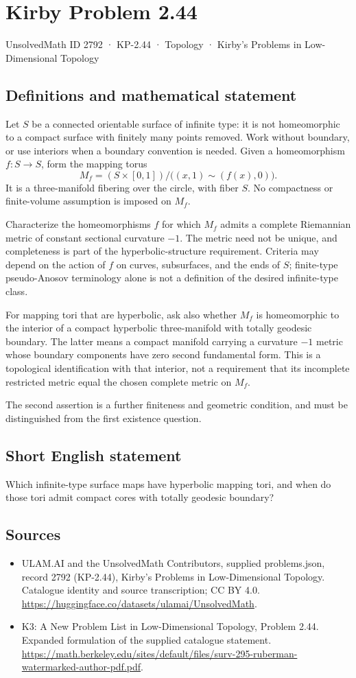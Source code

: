 \documentclass[11pt,a4paper]{article}
\begin{document}
\section*{Kirby Problem 2.44}\label{2792}
{\small UnsolvedMath ID 2792 · KP-2.44 · Topology · Kirby's Problems in Low-Dimensional Topology}
\subsection{Definitions and mathematical statement}
Let $S$ be a connected orientable surface of infinite type: it is not homeomorphic to a compact surface with finitely many points removed. Work without boundary, or use interiors when a boundary convention is needed. Given a homeomorphism $f:S\to S$, form the mapping torus
\[
M_f=(S\times[0,1])/\bigl((x,1)\sim(f(x),0)\bigr).
\]
It is a three-manifold fibering over the circle, with fiber $S$. No compactness or finite-volume assumption is imposed on $M_f$.

Characterize the homeomorphisms $f$ for which $M_f$ admits a complete Riemannian metric of constant sectional curvature $-1$. The metric need not be unique, and completeness is part of the hyperbolic-structure requirement. Criteria may depend on the action of $f$ on curves, subsurfaces, and the ends of $S$; finite-type pseudo-Anosov terminology alone is not a definition of the desired infinite-type class.

For mapping tori that are hyperbolic, ask also whether $M_f$ is homeomorphic to the interior of a compact hyperbolic three-manifold with totally geodesic boundary. The latter means a compact manifold carrying a curvature $-1$ metric whose boundary components have zero second fundamental form. This is a topological identification with that interior, not a requirement that its incomplete restricted metric equal the chosen complete metric on $M_f$.

The second assertion is a further finiteness and geometric condition, and must be distinguished from the first existence question.
\subsection{Short English statement}
Which infinite-type surface maps have hyperbolic mapping tori, and when do those tori admit compact cores with totally geodesic boundary?
\subsection{Sources}
\begin{itemize}
\item[S1] ULAM.AI and the UnsolvedMath Contributors, supplied problems.json, record 2792 (KP-2.44), Kirby's Problems in Low-Dimensional Topology. Catalogue identity and source transcription; CC BY 4.0.
\url{https://huggingface.co/datasets/ulamai/UnsolvedMath}.
\item[S2] K3: A New Problem List in Low-Dimensional Topology, Problem 2.44. Expanded formulation of the supplied catalogue statement.
\url{https://math.berkeley.edu/sites/default/files/surv-295-ruberman-watermarked-author-pdf.pdf}.
\end{itemize}
\end{document}

